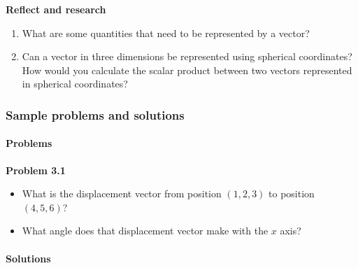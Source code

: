 \begin{framed}
\textbf{Reflect and research}\\
\begin{enumerate}
\item What are some quantities that need to be represented by a vector?
\item Can a vector in three dimensions be represented using spherical coordinates? How would you calculate the scalar product between two vectors represented in spherical coordinates?
\end{enumerate}
\end{framed}

\subsubsection{Sample problems and solutions}

\paragraph{Problems}

\begin{framed}
\textbf{Problem 3.1}\\
\begin{itemize}
\item What is the displacement vector from position $(1,2,3)$ to position $(4,5,6)$?
\item What angle does that displacement vector make with the $x$ axis?
\end{itemize}
\end{framed}

\paragraph{Solutions}


